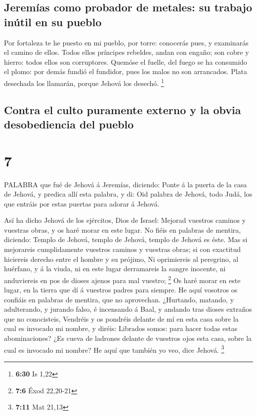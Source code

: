 \hypertarget{jeremuxedas-como-probador-de-metales-su-trabajo-inuxfatil-en-su-pueblo}{%
\subsection{Jeremías como probador de metales: su trabajo inútil en su
pueblo}\label{jeremuxedas-como-probador-de-metales-su-trabajo-inuxfatil-en-su-pueblo}}

 Por fortaleza te he puesto en mi pueblo, por torre:
conocerás pues, y examinarás el camino de ellos.  Todos
ellos príncipes rebeldes, andan con engaño; son cobre y hierro: todos
ellos son corruptores.  Quemóse el fuelle, del fuego se ha
consumido el plomo: por demás fundió el fundidor, pues los malos no son
arrancados.  Plata desechada los llamarán, porque Jehová
los desechó. \footnote{\textbf{6:30} Is 1,22}

\hypertarget{contra-el-culto-puramente-externo-y-la-obvia-desobediencia-del-pueblo}{%
\subsection{Contra el culto puramente externo y la obvia desobediencia
del
pueblo}\label{contra-el-culto-puramente-externo-y-la-obvia-desobediencia-del-pueblo}}

\hypertarget{section-6}{%
\section{7}\label{section-6}}

 PALABRA que fué de Jehová á Jeremías, diciendo:
 Ponte á la puerta de la casa de Jehová, y predica allí esta
palabra, y di: Oid palabra de Jehová, todo Judá, los que entráis por
estas puertas para adorar á Jehová.

 Así ha dicho Jehová de los ejércitos, Dios de Israel:
Mejorad vuestros caminos y vuestras obras, y os haré morar en este
lugar.  No fiéis en palabras de mentira, diciendo: Templo de
Jehová, templo de Jehová, templo de Jehová es éste.  Mas si
mejorareis cumplidamente vuestros caminos y vuestras obras; si con
exactitud hiciereis derecho entre el hombre y su prójimo, 
Ni oprimiereis al peregrino, al huérfano, y á la viuda, ni en este lugar
derramareis la sangre inocente, ni anduviereis en pos de dioses ajenos
para mal vuestro; \footnote{\textbf{7:6} Éxod 22,20-21}  Os
haré morar en este lugar, en la tierra que dí á vuestros padres para
siempre.  He aquí vosotros os confiáis en palabras de
mentira, que no aprovechan.  ¿Hurtando, matando, y
adulterando, y jurando falso, é incensando á Baal, y andando tras dioses
extraños que no conocisteis,  Vendréis y os pondréis
delante de mí en esta casa sobre la cual es invocado mi nombre, y
diréis: Librados somos: para hacer todas estas abominaciones?
 ¿Es cueva de ladrones delante de vuestros ojos esta casa,
sobre la cual es invocado mi nombre? He aquí que también yo veo, dice
Jehová. \footnote{\textbf{7:11} Mat 21,13}

